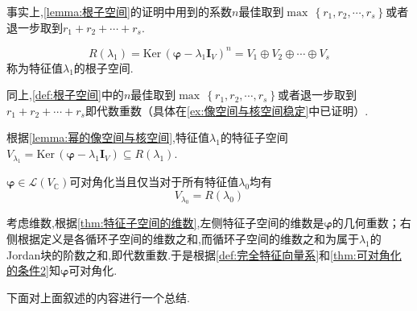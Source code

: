 \begin{red}
    \begin{remark}
        事实上,\cref{lemma:根子空间}的证明中用到的系数$n$最佳取到$\max\,\left\{
            r_1,r_2,\cdots,r_s
        \right\}$或者退一步取到$r_1+r_2+\cdots+r_s.$
    \end{remark}
\end{red}
\begin{formal}
\begin{definition}[根子空间]\label{def:根子空间}
    \[
    R\left(\lambda_1\right)=\mathrm{Ker}\,\left(
        \bm{\varphi}-\lambda_1\bm{I}_V
    \right)^n=V_1\oplus V_2\oplus\cdots\oplus V_s
    \]称为特征值$\lambda_1$的根子空间.
\end{definition}
\end{formal}
\begin{red}
\begin{remark}
    同上,\cref{def:根子空间}中的$n$最佳取到$\max\,\left\{
        r_1,r_2,\cdots,r_s
    \right\}$或者退一步取到$r_1+r_2+\cdots+r_s$即代数重数（具体在\cref{ex:像空间与核空间稳定}中已证明）.
\end{remark}
\end{red}
\begin{red}
\begin{remark}
    根据\cref{lemma:幂的像空间与核空间},特征值$\lambda_1$的特征子空间$V_{\lambda_1}=\mathrm{Ker}\,\left(\bm{\varphi}-\lambda_1\bm{I}_V\right)\subseteq R\left(\lambda_1\right).$
\end{remark}
\end{red}
\begin{green}
\begin{corollary}[可对角化条件]\label{cor:可对角化条件}
    $\bm{\varphi}\in \mathcal{L}\left(V_{\mathbb{C}}\right)$可对角化当且仅当对于所有特征值$\lambda_0$均有\[
    V_{\lambda_0}=R\left(\lambda_0\right)
    \]
\end{corollary}
\begin{Proof}
    考虑维数,根据\cref{thm:特征子空间的维数},左侧特征子空间的维数是$\bm{\varphi}$的几何重数；右侧根据定义是各循环子空间的维数之和,而循环子空间的维数之和为属于$\lambda_1$的\textup{Jordan}块的阶数之和,即代数重数.于是根据\cref{def:完全特征向量系}和\cref{thm:可对角化的条件2}知$\bm{\varphi}$可对角化.
\end{Proof}
\end{green}
下面对上面叙述的内容进行一个总结.
